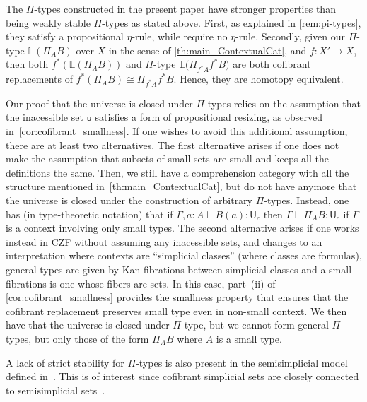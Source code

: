 \documentclass[reqno,10pt,a4paper,oneside]{amsart}
\numberwithin{equation}{section}
\theoremstyle{mythm}
\theoremstyle{mydef}
\theoremstyle{myrmk}
\newcommand{\co}{\colon}
\newcommand{\U}{\mathsf{U}}
\begin{document}
\begin{remark}
The $\Pi$-types constructed in the present paper have stronger properties than being weakly stable $\Pi$-types as stated above. First, as explained in \cref{rem:pi-types}, they satisfy a propositional $\eta$-rule, while \cite{LumsdaineP:locuoc} require no $\eta$-rule. Secondly, given our $\Pi$-type $\mathbb{L}(\Pi_A B)$ over $X$ in the sense of \cref{th:main_ContextualCat}, and $f \co X'  \rightarrow X$, then  both $f^*( \mathbb{L} ( \Pi_A B ))$ and $\Pi$-type $\mathbb{L} \big( \Pi_{f^* A} f^* B \big)$ are both cofibrant replacements of $f^* (\Pi_A B) \cong \Pi_{f^*A} f^* B $. Hence, they are homotopy equivalent. 
\end{remark}


\begin{remark} \label{rem:strength}
Our proof that the universe is closed under $\Pi$-types relies on the assumption that the inacessible set $\mathsf{u}$ satisfies a form of propositional resizing, as observed in~\cref{cor:cofibrant_smallness}. If one wishes to avoid this additional assumption, there are at least two alternatives.
The first alternative arises if one does not make the assumption that subsets of small sets are small and keeps all the definitions the same. Then, we still have a comprehension category with all the structure mentioned in~\cref{th:main_ContextualCat}, but do not have anymore that the universe is closed under the construction of arbitrary $\Pi$-types. Instead, one has (in type-theoretic notation) that if  $\Gamma, a \co A \vdash B(a) \co \U_c$ then $\Gamma \vdash \Pi_A B \co \U_c$ if $\Gamma$ is a context  involving only small types. The second alternative arises if one works instead in CZF without assuming any inacessible sets, and changes to an interpretation where contexts are ``simplicial classes'' (where classes are formulas), general types are given by Kan fibrations between simplicial classes and a small fibrations is one whose fibers are sets. In this case, part~(ii) of \cref{cor:cofibrant_smallness}  provides the smallness property that ensures that the cofibrant replacement preserves small type even in non-small context.  We then   have that the universe is closed under $\Pi$-type, but we cannot form general  $\Pi$-types, but only those of the form $\Pi_A B$ where $A$ is a small type.
\end{remark}


\begin{remark} A lack of strict stability for $\Pi$-types is also present in the semisimplicial
model defined in~\cite{CoquandT:gentgi}. This is of interest since cofibrant simplicial
sets are closely connected to semisimplicial sets~\cite{henry2019qms}. 
\end{remark} 
\end{document}
